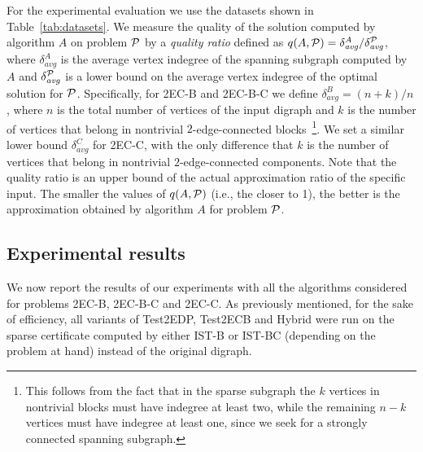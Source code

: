 \documentclass[11pt]{article}
\begin{document}
For the experimental evaluation we use the datasets shown in
Table~\ref{tab:datasets}. We measure the quality of the solution
computed by algorithm $A$ on problem ${\cal P}$ by a \emph{quality
ratio} defined as $q(A,{\cal P}) =
\delta_{\mathit{avg}}^{A}/\delta_{\mathit{avg}}^{{\cal P}}$, where
$\delta_{\mathit{avg}}^{A}$ is the average vertex indegree of the spanning
subgraph computed by $A$ and $\delta_{\mathit{avg}}^{{\cal P}}$ is
a lower bound on the average vertex indegree of the optimal
solution for ${\cal P}$.
Specifically, for \textsf{2EC-B} and
\textsf{2EC-B-C} we define
$\delta_{\mathit{avg}}^{B} = (n+k)/n$, where $n$ is the total number of vertices of the input digraph and $k$ is the number of vertices that belong in nontrivial $2$-edge-connected blocks~\footnote{This follows from the fact that in the sparse subgraph the $k$ vertices in nontrivial blocks must have indegree at least two, while the remaining $n-k$ vertices must have indegree at least one, since we seek for a strongly connected spanning subgraph.}.
We set a similar lower bound $\delta_{\mathit{avg}}^{C}$ for \textsf{2EC-C}, with the only difference that $k$ is the number of vertices that belong in nontrivial $2$-edge-connected components.
Note that the quality ratio is an upper bound of the actual approximation ratio of the specific input. 
The smaller the values of  $q(A,{\cal P})$ (i.e., the closer to 1), the better is the approximation obtained by algorithm $A$ for problem ${\cal P}$.


\subsection{Experimental results}
\label{sec:results}
We now report the results of our experiments with all the algorithms
considered for problems \textsf{2EC-B}, \textsf{2EC-B-C}  and \textsf{2EC-C}. As previously mentioned, for the sake of efficiency, all variants of \textsf{Test2EDP}, \textsf{Test2ECB} and \textsf{Hybrid}
were run on the sparse certificate computed by either \textsf{IST-B} or \textsf{IST-BC}
(depending on the problem at hand) instead of the original digraph.
\end{document}
